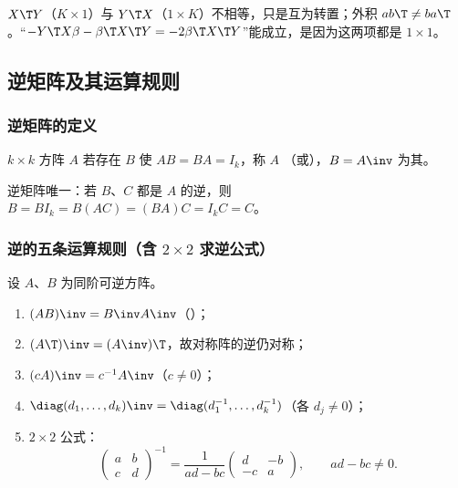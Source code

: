 \begin{note}
$X\T Y$（$K\times1$）与 $Y\T X$（$1\times K$）不相等，只是互为转置；外积 $ab\T\neq ba\T$。“$-Y\T X\beta-\beta\T X\T Y=-2\beta\T X\T Y$”能成立，是因为这两项都是 $1\times1$。
\end{note}

\subsection{逆矩阵及其运算规则}

\subsubsection{逆矩阵的定义}

\begin{defn}[逆矩阵]\label{def:U01a-inverse}
$k\times k$ 方阵 $A$ 若存在 $B$ 使 $AB=BA=I_k$，称 $A$ （或），$B=A\inv$ 为其。
\end{defn}
逆矩阵唯一：若 $B$、$C$ 都是 $A$ 的逆，则 $B=BI_k=B(AC)=(BA)C=I_kC=C$。

\subsubsection{逆的五条运算规则（含 \texorpdfstring{$2\times2$}{2 x 2} 求逆公式）}

\begin{thm}[逆的运算规则]\label{thm:U01a-invrules}
设 $A$、$B$ 为同阶可逆方阵。
\begin{enumerate}
  \item $(AB)\inv=B\inv A\inv$（）；
  \item $(A\T)\inv=(A\inv)\T$，故对称阵的逆仍对称；
  \item $(cA)\inv=c^{-1}A\inv$（$c\neq0$）；
  \item $\diag(d_1,\dots,d_k)\inv=\diag(d_1^{-1},\dots,d_k^{-1})$（各 $d_j\neq0$）；
  \item $2\times2$ 公式：
  \begin{equation}\label{eq:U01a-inv22}
  \begin{pmatrix}a&b\\c&d\end{pmatrix}^{-1}=\frac1{ad-bc}\begin{pmatrix}d&-b\\-c&a\end{pmatrix},\qquad ad-bc\neq0.
  \end{equation}
\end{enumerate}
\end{thm}

